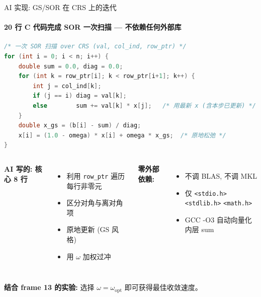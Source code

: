 \documentclass[12pt,aspectratio=169]{beamer}
\begin{document}
\begin{frame}{AI 实现: GS/SOR 在 CRS 上的迭代}
\framesubtitle{20 行 C 代码完成 SOR 一次扫描 — 不依赖任何外部库}

\begin{lstlisting}[language=C,basicstyle=\ttfamily\scriptsize,belowskip=-2pt,aboveskip=0pt,numbers=none]
/* 一次 SOR 扫描 over CRS (val, col_ind, row_ptr) */
for (int i = 0; i < n; i++) {
    double sum = 0.0, diag = 0.0;
    for (int k = row_ptr[i]; k < row_ptr[i+1]; k++) {
        int j = col_ind[k];
        if (j == i) diag = val[k];
        else        sum += val[k] * x[j];   /* 用最新 x (含本步已更新) */
    }
    double x_gs = (b[i] - sum) / diag;
    x[i] = (1.0 - omega) * x[i] + omega * x_gs;  /* 原地松弛 */
}
\end{lstlisting}

\vspace{2pt}
\footnotesize
\begin{columns}[T]
\textbf{AI 写的: 核心 8 行}
\begin{itemize}\itemsep0pt
  \item 利用 \texttt{row\_ptr} 遍历每行非零元
  \item 区分对角与离对角项
  \item 原地更新 (GS 风格)
  \item 用 $\omega$ 加权过冲
\end{itemize}

\textbf{零外部依赖:}
\begin{itemize}\itemsep0pt
  \item 不调 BLAS, 不调 MKL
  \item 仅 \texttt{<stdio.h>} \texttt{<stdlib.h>} \texttt{<math.h>}
  \item GCC -O3 自动向量化内层 sum
\end{itemize}
\end{columns}

\vspace{2pt}
\normalsize \textbf{结合 frame 13 的实验:} 选择 $\omega = \omega_{\text{opt}}$ 即可获得最佳收敛速度。
\end{frame}
\end{document}
